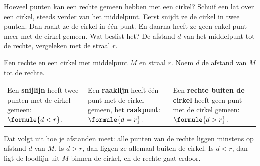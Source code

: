 Hoeveel punten kan een rechte gemeen hebben met een cirkel? Schuif een lat over een cirkel, steeds verder van het middelpunt. Eerst snijdt ze de cirkel in twee punten. Dan raakt ze de cirkel in één punt. En daarna heeft ze geen enkel punt meer met de cirkel gemeen. Wat beslist het? De afstand $d$ van het middelpunt tot de rechte, vergeleken met de straal $r$.

\begin{theorie}
Een rechte en een cirkel met middelpunt $M$ en straal $r$. Noem $d$ de afstand van $M$ tot de rechte.

\vspace{1mm}
\begin{tabular}{@{}p{4.6cm}p{4.6cm}p{4.6cm}@{}}
Een \textbf{\textcolor{accent}{snijlijn}} heeft twee punten met de cirkel gemeen: $\formule{d < r}$. &
Een \textbf{\textcolor{accent}{raaklijn}} heeft één punt met de cirkel gemeen, het \textbf{\textcolor{accent}{raakpunt}}: $\formule{d = r}$. &
Een \textbf{\textcolor{accent}{rechte buiten de cirkel}} heeft geen punt met de cirkel gemeen: $\formule{d > r}$.
\end{tabular}

\vspace{1mm}
\centering
{}
\end{theorie}

Dat volgt uit hoe je afstanden meet: alle punten van de rechte liggen minstens op afstand $d$ van $M$. Is $d > r$, dan liggen ze allemaal buiten de cirkel. Is $d < r$, dan ligt de loodlijn uit $M$ binnen de cirkel, en de rechte gaat erdoor.


